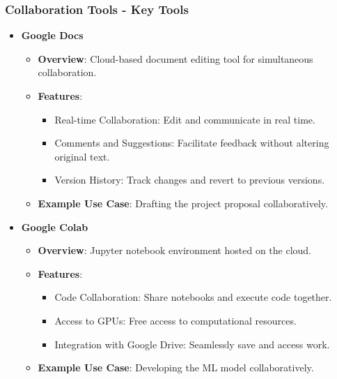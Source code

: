 \documentclass[aspectratio=169]{beamer}
\begin{document}
\begin{frame}[fragile]
    \frametitle{Collaboration Tools - Key Tools}
    \begin{itemize}
        \item \textbf{Google Docs}   
        \begin{itemize}
            \item \textbf{Overview}: Cloud-based document editing tool for simultaneous collaboration.
            \item \textbf{Features}:
            \begin{itemize}
                \item Real-time Collaboration: Edit and communicate in real time.
                \item Comments and Suggestions: Facilitate feedback without altering original text.
                \item Version History: Track changes and revert to previous versions.
            \end{itemize}
            \item \textbf{Example Use Case}: Drafting the project proposal collaboratively.
        \end{itemize}
        
        \item \textbf{Google Colab}   
        \begin{itemize}
            \item \textbf{Overview}: Jupyter notebook environment hosted on the cloud.
            \item \textbf{Features}:
            \begin{itemize}
                \item Code Collaboration: Share notebooks and execute code together.
                \item Access to GPUs: Free access to computational resources.
                \item Integration with Google Drive: Seamlessly save and access work.
            \end{itemize}
            \item \textbf{Example Use Case}: Developing the ML model collaboratively.
        \end{itemize}
    \end{itemize}
\end{frame}
\end{document}
